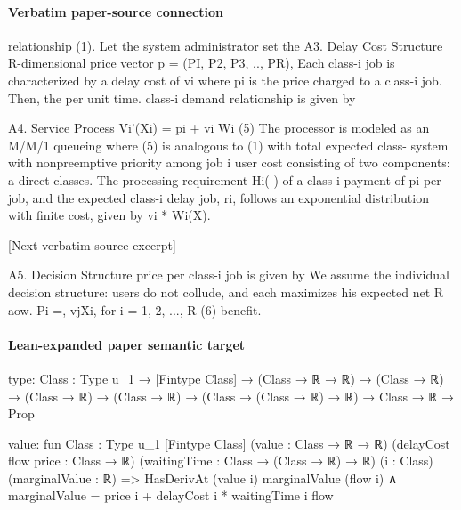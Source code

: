 \documentclass[10pt]{article}
\begin{document}
\paragraph{Verbatim paper-source connection}
\begin{ReviewVerbatim}
relationship (1). Let the system administrator set the
A3. Delay Cost Structure
                                                                       R-dimensional price vector p = (PI, P2, P3, .., PR),
Each class-i job is characterized by a delay cost of vi                where pi is the price charged to a class-i job. Then, the
per unit time.                                                         class-i demand relationship is given by

A4. Service Process                                                      Vi'(Xi) = pi + vi Wi (5)
The processor is modeled as an M/M/1 queueing                          where (5) is analogous to (1) with total expected class-
system with nonpreemptive priority among job                           i user cost consisting of two components: a direct
classes. The processing requirement Hi(-) of a class-i                 payment of pi per job, and the expected class-i delay
job, ri, follows an exponential distribution with finite cost, given by vi * Wi(X).

[Next verbatim source excerpt]

A5. Decision Structure
                                                                      price per class-i job is given by
We assume the individual decision structure: users do
not collude, and each maximizes his expected net
                                                                                 R aow.
                                                                        Pi =, vjXi, for i = 1, 2, ..., R (6)
benefit.
\end{ReviewVerbatim}



\paragraph{Lean-expanded paper semantic target}
\begin{ReviewVerbatim}
type:
{Class : Type u_1} →
  [Fintype Class] →
    (Class → ℝ → ℝ) → (Class → ℝ) → (Class → ℝ) → (Class → ℝ) → (Class → (Class → ℝ) → ℝ) → Class → ℝ → Prop

value:
fun {Class : Type u_1} [Fintype Class] (value : Class → ℝ → ℝ) (delayCost flow price : Class → ℝ)
    (waitingTime : Class → (Class → ℝ) → ℝ) (i : Class) (marginalValue : ℝ) =>
  HasDerivAt (value i) marginalValue (flow i) ∧ marginalValue = price i + delayCost i * waitingTime i flow
\end{ReviewVerbatim}
\end{document}
